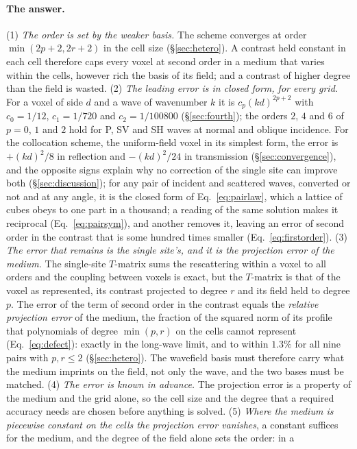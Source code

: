 \documentclass[11pt,a4paper]{article}
\begin{document}
\paragraph{The answer.} (1) \emph{The order is set by the weaker basis.} The scheme converges at order
$\min(2p+2,2r+2)$ in the cell size (\S\ref{sec:hetero}). A contrast held constant in each cell
therefore caps every voxel at second order in a medium that varies within the cells, however rich the
basis of its field; and a contrast of higher degree than the field is wasted. (2) \emph{The leading
error is in closed form, for every grid.} For a voxel of side $d$ and a wave of wavenumber $k$ it is
$c_p(kd)^{2p+2}$ with $c_0=1/12$, $c_1=1/720$ and $c_2=1/100800$ (\S\ref{sec:fourth}); the orders $2$, $4$
and $6$ of $p=0$, $1$ and $2$ hold for P, SV and SH waves at normal and oblique incidence. For the collocation scheme, the uniform-field voxel in its simplest form, the error
is $+(kd)^2/8$ in reflection and $-(kd)^2/24$ in transmission (\S\ref{sec:convergence}), and the
opposite signs explain why no correction of the single site can improve both
(\S\ref{sec:discussion}); for any pair of incident and scattered waves, converted or not and at any
angle, it is the closed form of Eq.~\eqref{eq:pairlaw}, which a lattice of cubes obeys to one part in a
thousand; a reading of the same solution makes it reciprocal (Eq.~\eqref{eq:pairsym}), and another
removes it, leaving an error of second order in the contrast that is some hundred times smaller
(Eq.~\eqref{eq:firstorder}). (3) \emph{The error that remains is the single site's, and it is the
projection error of the medium.} The single-site $T$-matrix sums the rescattering within a voxel to all
orders and the coupling between voxels is exact, but the $T$-matrix is that of the voxel as
represented, its contrast projected to degree $r$ and its field held to degree $p$. The error of the
term of second order in the contrast equals the \emph{relative projection error} of the medium, the
fraction of the squared norm of its profile that polynomials of degree $\min(p,r)$ on the cells cannot
represent (Eq.~\eqref{eq:defect}): exactly in the long-wave limit, and to within $1.3\%$ for all nine
pairs with $p,r\le2$ (\S\ref{sec:hetero}). The wavefield basis must therefore carry what the medium
imprints on the field, not only the wave, and the two bases must be matched. (4) \emph{The error is
known in advance.} The projection error is a property of the medium and the grid alone, so the cell
size and the degree that a required accuracy needs are chosen before anything is solved. (5) \emph{Where the medium is piecewise constant on the cells the projection error
vanishes}, a constant suffices for the medium, and the degree of the field alone sets the order: in a
\end{document}
